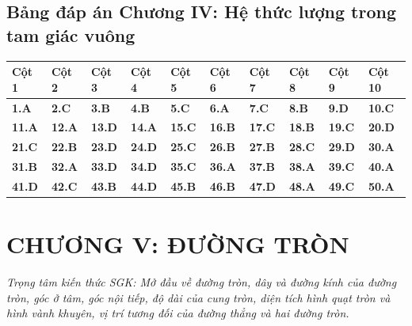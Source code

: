 \documentclass[11pt,a4paper]{article}
\begin{document}
\subsection*{\color{primary} Bảng đáp án Chương IV: Hệ thức lượng trong tam giác vuông}
\begin{center}
\renewcommand{\arraystretch}{1.25}
\begin{tabularx}{\textwidth}{*{10}{>{\centering\arraybackslash}X}}
\toprule
\textbf{\color{primary} Cột 1} & \textbf{\color{primary} Cột 2} & \textbf{\color{primary} Cột 3} & \textbf{\color{primary} Cột 4} & \textbf{\color{primary} Cột 5} & \textbf{\color{primary} Cột 6} & \textbf{\color{primary} Cột 7} & \textbf{\color{primary} Cột 8} & \textbf{\color{primary} Cột 9} & \textbf{\color{primary} Cột 10} \\
\midrule
\textbf{1.A} & \textbf{2.C} & \textbf{3.B} & \textbf{4.B} & \textbf{5.C} & \textbf{6.A} & \textbf{7.C} & \textbf{8.B} & \textbf{9.D} & \textbf{10.C} \\
\rowcolor{rowtint} \textbf{11.A} & \textbf{12.A} & \textbf{13.D} & \textbf{14.A} & \textbf{15.C} & \textbf{16.B} & \textbf{17.C} & \textbf{18.B} & \textbf{19.C} & \textbf{20.D} \\
\textbf{21.C} & \textbf{22.B} & \textbf{23.D} & \textbf{24.D} & \textbf{25.C} & \textbf{26.B} & \textbf{27.B} & \textbf{28.C} & \textbf{29.D} & \textbf{30.A} \\
\rowcolor{rowtint} \textbf{31.B} & \textbf{32.A} & \textbf{33.D} & \textbf{34.D} & \textbf{35.C} & \textbf{36.A} & \textbf{37.B} & \textbf{38.A} & \textbf{39.C} & \textbf{40.A} \\
\textbf{41.D} & \textbf{42.C} & \textbf{43.B} & \textbf{44.D} & \textbf{45.B} & \textbf{46.B} & \textbf{47.D} & \textbf{48.A} & \textbf{49.C} & \textbf{50.A} \\
\bottomrule
\end{tabularx}
\end{center}\vspace{10pt}
\section*{\color{primary} CHƯƠNG V: ĐƯỜNG TRÒN}
\textit{Trọng tâm kiến thức SGK: Mở đầu về đường tròn, dây và đường kính của đường tròn, góc ở tâm, góc nội tiếp, độ dài của cung tròn, diện tích hình quạt tròn và hình vành khuyên, vị trí tương đối của đường thẳng và hai đường tròn.}\par\vspace{4pt}
\end{document}
